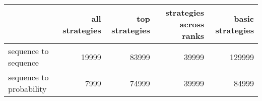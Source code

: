 \begin{tabular}{lrrrr}
\toprule
{} &  all strategies &  top strategies &  strategies across ranks &  basic strategies \\
\midrule
sequence to sequence    &           19999 &           83999 &                    39999 &            129999 \\
sequence to probability &            7999 &           74999 &                    39999 &             84999 \\
\bottomrule
\end{tabular}
